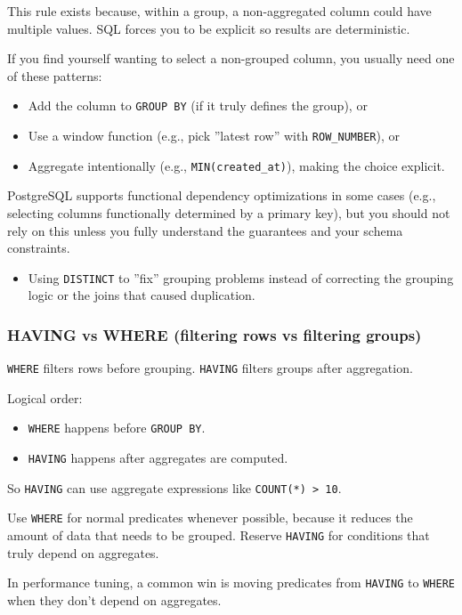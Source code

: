 \M This rule exists because, within a group, a non-aggregated column could have multiple values. 
SQL forces you to be explicit so results are deterministic.

\Sx If you find yourself wanting to select a non-grouped column, you usually need one of 
these patterns:
\begin{itemize}
  \item Add the column to \texttt{GROUP BY} (if it truly defines the group), or
  \item Use a window function (e.g., pick ''latest row'' with \texttt{ROW\_NUMBER}), or
  \item Aggregate intentionally (e.g., \texttt{MIN(created\_at)}), making the choice explicit.
\end{itemize}

\E PostgreSQL supports functional dependency optimizations in some cases (e.g., selecting 
columns functionally determined by a primary key), but you should not rely on this unless you 
fully understand the guarantees and your schema constraints.

\Pitfall
\begin{itemize}
  \item Using \texttt{DISTINCT} to ''fix'' grouping problems instead of correcting the grouping 
  logic or the joins that caused duplication.
\end{itemize}

\subsubsection{HAVING vs WHERE (filtering rows vs filtering groups)}
\J \texttt{WHERE} filters rows before grouping. \texttt{HAVING} filters groups after aggregation.

\M Logical order:
\begin{itemize}
  \item \texttt{WHERE} happens before \texttt{GROUP BY}.
  \item \texttt{HAVING} happens after aggregates are computed.
\end{itemize}
So \texttt{HAVING} can use aggregate expressions like \texttt{COUNT(*) > 10}.

\Sx Use \texttt{WHERE} for normal predicates whenever possible, because it reduces the amount 
of data that needs to be grouped. Reserve \texttt{HAVING} for conditions that truly depend on 
aggregates.

\E In performance tuning, a common win is moving predicates from \texttt{HAVING} to 
\texttt{WHERE} when they don't depend on aggregates.

